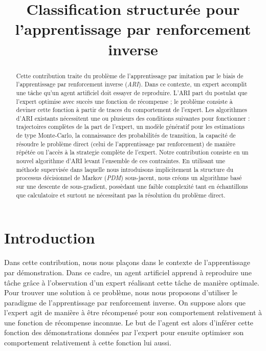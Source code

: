 \documentclass[publibook-draft]{CAp2012}
\title{Classification structurée pour l'apprentissage par renforcement inverse}
\author{\fontsize{12}{12}\selectfont{Edouard Klein\inst{1}$^,$\inst{2}, Bilal Piot \inst{1}$^,$\inst{3}, Matthieu Geist\inst{1}, Olivier Pietquin\inst{1}$^,$\inst{3}}}
\institute{
Sup\'elec, IMS Research group, France, \texttt{prenom.nom@supelec.fr}
\and
Equipe ABC,
LORIA, France
\and
UMI 2958
GeorgiaTech-CNRS, France
}
\begin{document}
\maketitle


\begin{abstract}
  Cette contribution traite du problème de l'apprentissage par imitation par le biais de l'apprentissage par renforcement inverse (\emph{ARI}). Dans ce contexte, un expert accomplit une tâche qu'un agent artificiel doit essayer de reproduire. L'ARI part du postulat que l'expert optimise avec succès une fonction de récompense ; le problème consiste à deviner cette fonction à partir de  traces du comportement de l'expert. Les algorithmes d'ARI existants nécessitent une ou plusieurs des conditions suivantes pour fonctionner : trajectoires complètes de la part de l'expert, un modèle génératif pour les estimations de type Monte-Carlo, la connaissance des probabilités de transition, la capacité de résoudre le problème direct (celui de l'apprentissage par renforcement) de manière répétée ou l'accès à la strategie complète de l'expert. Notre contribution consiste en un nouvel algorithme d'ARI levant l'ensemble de ces contraintes. En utilisant une méthode supervisée dans laquelle nous introduisons implicitement la structure du processus décisionnel de Markov ({\it PDM}) sous-jacent, nous créons un algorithme basé sur une descente de sous-gradient, possèdant une faible complexité tant en échantillons que calculatoire et surtout ne nécessitant pas la résolution du problème direct.
\end{abstract}
\section{Introduction}
Dans cette contribution, nous nous plaçons dans le contexte de l'apprentissage par démonstration. Dans ce cadre, un agent artificiel apprend à reproduire une tâche grâce à l'observation d'un expert réalisant cette tâche de manière optimale. Pour trouver une solution à ce problème, nous nous proposons d'utiliser le paradigme de l'apprentissage par renforcement inverse. On suppose alors que l'expert agit de manière à être récompensé pour son comportement relativement à une fonction de récompense inconnue. Le but de l'agent est alors d'inférer cette fonction des démonstrations données par l'expert pour ensuite optimiser son comportement relativement à cette fonction lui aussi.\\
\end{document}
